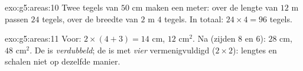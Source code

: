 \begin{solution}{exo:g5:areas:10}
Twee tegels van $50$ cm maken een meter: over de lengte van $12$ m passen
$24$ tegels, over de breedte van $2$ m $4$ tegels. In totaal:
$24 \times 4 = 96$ tegels.
\end{solution}

\begin{solution}{exo:g5:areas:11}
Voor:  $2 \times (4 + 3) = 14$ cm,  $12$ cm$^2$. Na (zijden
$8$ en $6$):  $28$ cm,  $48$ cm$^2$. De  is
\emph{verdubbeld}; de  is met \emph{vier} vermenigvuldigd
($2 \times 2$): lengtes en  schalen niet op dezelfde manier.
\end{solution}
